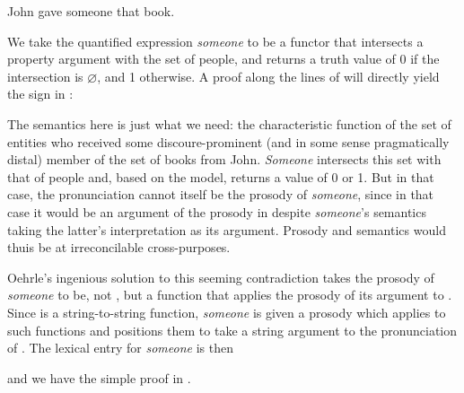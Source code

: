 \documentclass[output=paper,colorlinks,citecolor=brown]{langscibook}
\begin{document}
\begin{exe}
 \ex\label{someone}
  John gave someone that book.
\end{exe}
We take the quantified expression \textit{someone} to be a functor that
intersects a property argument with the set of people, and returns a
truth value of 0 if the intersection is $\varnothing$, and 1
otherwise. A proof along the lines of  will directly yield the
sign in :

\begin{exe}
 \ex\label{gaveTerm}
\end{exe}
The semantics here is just what we need: the characteristic function
of the set of entities who received some discoure-prominent (and in
some sense pragmatically distal) member of the set of books from
John. \textit{Someone} intersects this set with that of people and, based on
the model, returns a value of 0 or 1. But in that case, the pronunciation
 cannot itself be the prosody of \textit{someone}, since in that
case it would be an argument of the prosody in  despite
\textit{someone}'s semantics taking the latter's
interpretation as its argument. Prosody and semantics would thuis be at
irreconcilable cross-purposes.

Oehrle's ingenious solution to this seeming contradiction takes the
prosody of \textit{someone} to be, not , but a function that
applies the prosody of its  argument to . Since
 is a string-to-string
function, \textit{someone} is given a prosody which applies to such functions
and positions them to take a string argument  to the
pronunciation of . The lexical entry for \textit{someone} is then

\begin{exe}
 \ex\label{someoneEntry}
\end{exe}
and we have the simple proof in .
\end{document}

